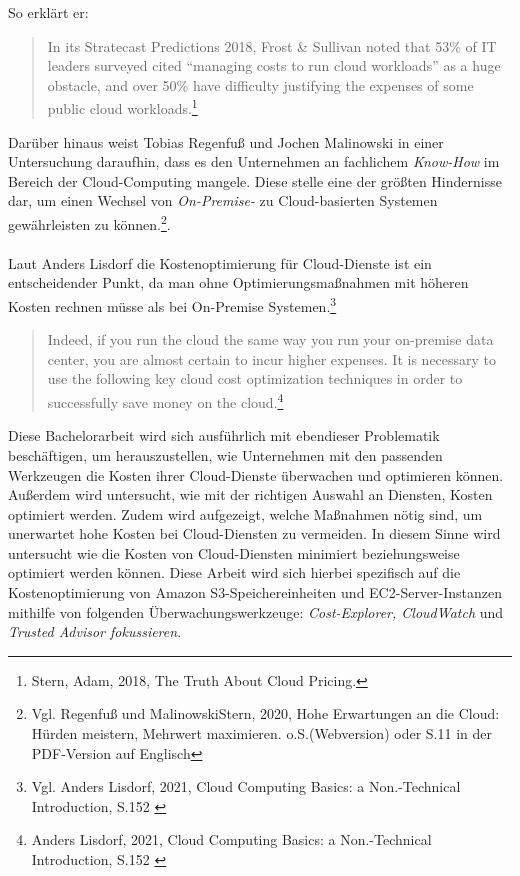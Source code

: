 So erklärt er: \\
\begin{quote}    
    In its Stratecast Predictions 2018, Frost \& Sullivan noted that 53\% of IT leaders surveyed cited “managing costs to run cloud workloads” as a huge obstacle, and over 50\% have difficulty justifying the expenses of some public cloud workloads.\footnote{Stern, Adam, 2018, The Truth About Cloud Pricing.\cite{SP1}}
\end{quote}
Darüber hinaus weist Tobias Regenfuß und Jochen Malinowski in einer Untersuchung daraufhin, dass es den Unternehmen an fachlichem \textit{Know-How} im Bereich der Cloud-Computing mangele. Diese stelle eine der größten Hindernisse dar, um einen Wechsel von \textit{On-Premise-} zu Cloud-basierten Systemen gewährleisten zu können.\footnote{Vgl. Regenfuß und MalinowskiStern, 2020, Hohe Erwartungen an die Cloud: Hürden meistern, Mehrwert maximieren. o.S.(Webversion) oder S.11 in der PDF-Version auf Englisch\cite{ACC1}}.
\\\\
Laut Anders Lisdorf die Kostenoptimierung für Cloud-Dienste ist ein entscheidender Punkt, da man ohne Optimierungsmaßnahmen mit höheren Kosten rechnen müsse als bei On-Premise Systemen.\footnote{Vgl. Anders Lisdorf, 2021, Cloud Computing Basics: a Non.-Technical Introduction, S.152 \cite{CCB}}
\\
\begin{quote}
    Indeed, if you run the cloud the same way you run your on-premise data center, you are almost certain to incur higher expenses. It is necessary to use the following key cloud cost optimization techniques in order to successfully save money on the cloud.\footnote{Anders Lisdorf, 2021, Cloud Computing Basics: a Non.-Technical Introduction, S.152 \cite{CCB}}
\end{quote}
\begin{flushleft}
Diese Bachelorarbeit wird sich ausführlich mit ebendieser Problematik beschäftigen, um herauszustellen, wie Unternehmen mit den passenden Werkzeugen die Kosten ihrer Cloud-Dienste überwachen und optimieren können. %
Außerdem wird untersucht, wie mit der richtigen Auswahl an Diensten, Kosten optimiert werden. 
Zudem wird aufgezeigt, welche Maßnahmen nötig sind, um unerwartet hohe Kosten bei Cloud-Diensten zu vermeiden. In diesem Sinne wird untersucht %
wie die Kosten von Cloud-Diensten minimiert beziehungsweise optimiert werden können. Diese Arbeit wird sich hierbei spezifisch auf die Kostenoptimierung  von Amazon S3-Speichereinheiten und EC2-Server-Instanzen mithilfe von folgenden Überwachungswerkzeuge: \textit{Cost-Explorer, CloudWatch} und \textit{Trusted Advisor fokussieren}.
\end{flushleft}


